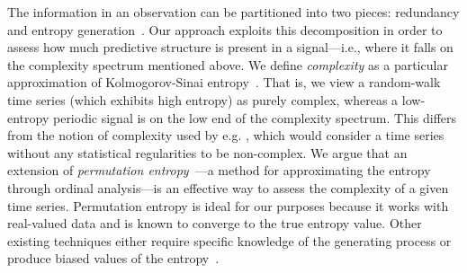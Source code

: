 
The information in an observation can be partitioned into two pieces:
redundancy and entropy generation~\cite{crutchfield2003}.
\label{page:redundancy}
Our approach exploits this decomposition in order to assess how much
predictive structure is present in a signal---i.e., where it falls on
the complexity spectrum mentioned above.  We define \emph{complexity}
as a particular approximation of Kolmogorov-Sinai
entropy~\cite{lind95}.  That is, we view a random-walk time series
(which exhibits high entropy) as purely complex, whereas a low-entropy
periodic signal is on the low end of the complexity spectrum.  This
differs from the notion of complexity used by e.g. \cite{Shalizi2008},
which would consider a time series without any statistical
regularities to be non-complex.  We argue that an extension of
\emph{permutation entropy}~\cite{bandt2002per}---a method for
approximating the entropy through ordinal analysis---is an effective
way to assess the complexity of a given time series.  Permutation
entropy is ideal for our purposes because it works with real-valued
data and is known to converge to the true entropy value. Other
existing techniques either require specific knowledge of the
generating process or produce biased values of the
entropy~\cite{bollt2001}.

